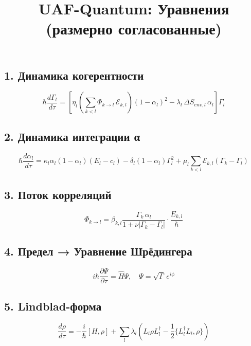 \documentclass{article}
\title{UAF-Quantum: Уравнения (размерно согласованные)}
\author{}
\begin{document}
\maketitle

\subsection{1. Динамика когерентности}

\begin{equation}
\hbar \frac{d \Gamma_l}{d \tau} = \left[ \eta_l \left( \sum_{k<l} \Phi_{k\to l} \,\mathcal{E}_{k,l} \right) (1-\alpha_l)^2 
- \lambda_l \, \Delta S_{env,l} \, \alpha_l \right] \Gamma_l
\end{equation}

\subsection{2. Динамика интеграции α}

\begin{equation}
\hbar \frac{d \alpha_l}{d \tau} = \kappa_l \alpha_l (1-\alpha_l)(E_l - c_l) 
- \delta_l (1-\alpha_l) \Gamma_l^2 
+ \mu_l \sum_{k<l} \mathcal{E}_{k,l} (\Gamma_k - \Gamma_l)
\end{equation}

\subsection{3. Поток корреляций}

\begin{equation}
\Phi_{k\to l} = \beta_{k,l} \frac{\Gamma_k \, \alpha_l}{1 + \nu |\Gamma_k - \Gamma_l|} \cdot \frac{E_{k,l}}{\hbar}
\end{equation}

\subsection{4. Предел → Уравнение Шрёдингера}

\begin{equation}
i \hbar \frac{\partial \Psi}{\partial \tau} = \hat{H} \Psi, \quad 
\Psi = \sqrt{\Gamma} \, e^{i \phi}
\end{equation}

\subsection{5. Lindblad-форма}

\begin{equation}
\frac{d\rho}{d\tau} = -\frac{i}{\hbar}[H, \rho] 
+ \sum_l \lambda_l \left( L_l \rho L_l^\dagger - \frac12 \{L_l^\dagger L_l, \rho\} \right)
\end{equation}
\end{document}

